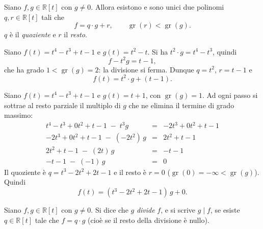 \documentclass[11pt,a4paper]{article}
\begin{document}
\begin{teorema}
Siano $f, g \in \mathbb{R}[t]$ con $g \neq 0$. Allora esistono e sono unici due
polinomi $q, r \in \mathbb{R}[t]$ tali che
\[
  f = q \cdot g + r , \qquad \operatorname{gr}(r) < \operatorname{gr}(g).
\]
$q$ è il \emph{quoziente} e $r$ il \emph{resto}.
\end{teorema}

\begin{esempio}
Siano $f(t) = t^4 - t^3 + t - 1$ e $g(t) = t^2 - t$. Si ha
$t^2 \cdot g = t^4 - t^3$, quindi
\[
  f - t^2 g = t - 1 ,
\]
che ha grado $1 < \operatorname{gr}(g) = 2$: la divisione si ferma. Dunque
$q = t^2$, $r = t - 1$ e
\[
  f(t) = t^2 \cdot g + (t - 1).
\]
\end{esempio}

\begin{esempio}
Siano $f(t) = t^4 - t^3 + t - 1$ e $g(t) = t + 1$, con
$\operatorname{gr}(g) = 1$. Ad ogni passo si sottrae al resto parziale il
multiplo di $g$ che ne elimina il termine di grado massimo:
\[
\begin{array}{rcl}
  t^4 - t^3 + 0t^2 + t - 1 \;-\; t^3 g &=& -2t^3 + 0t^2 + t - 1 \\
  -2t^3 + 0t^2 + t - 1 \;-\; (-2t^2)\, g &=& 2t^2 + t - 1 \\
  2t^2 + t - 1 \;-\; (2t)\, g &=& -t - 1 \\
  -t - 1 \;-\; (-1)\, g &=& 0
\end{array}
\]
Il quoziente è $q = t^3 - 2t^2 + 2t - 1$ e il resto è $r = 0$
($\operatorname{gr}(0) = -\infty < \operatorname{gr}(g)$). Quindi
\[
  f(t) = (t^3 - 2t^2 + 2t - 1)\, g + 0 .
\]
\end{esempio}

\begin{definizione}
Siano $f, g \in \mathbb{R}[t]$ con $g \neq 0$. Si dice che $g$ \emph{divide}
$f$, e si scrive $g \mid f$, se esiste $q \in \mathbb{R}[t]$ tale che
$f = q \cdot g$ (cioè se il resto della divisione è nullo).
\end{definizione}
\end{document}
